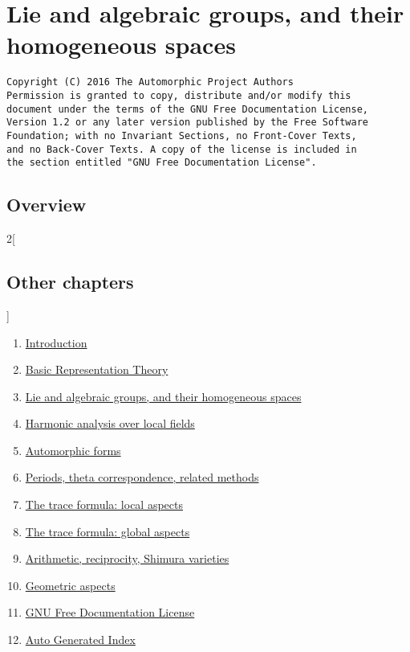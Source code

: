 \documentclass{stacks-project-book}
\theoremstyle{plain}
\theoremstyle{definition}
\theoremstyle{remark}
\numberwithin{equation}{subsection}
\begin{document}
%

\chapter{Lie and algebraic groups, and their homogeneous spaces}



\label{algebraicgroups-section-phantom}

\begin{verbatim}
Copyright (C) 2016 The Automorphic Project Authors
Permission is granted to copy, distribute and/or modify this
document under the terms of the GNU Free Documentation License,
Version 1.2 or any later version published by the Free Software
Foundation; with no Invariant Sections, no Front-Cover Texts,
and no Back-Cover Texts. A copy of the license is included in
the section entitled "GNU Free Documentation License".
\end{verbatim}



\section{Overview}
\label{algebraicgroups-section-overview}

\noindent





\begin{multicols}{2}[\section{Other chapters}]
\noindent
\begin{enumerate}
\item \hyperref[introduction-section-phantom]{Introduction}
\item \hyperref[representationtheory-section-phantom]{Basic Representation Theory}
\item \hyperref[algebraicgroups-section-phantom]{Lie and algebraic groups, and their homogeneous spaces}
\item \hyperref[harmonicanalysis-section-phantom]{Harmonic analysis over local fields}
\item \hyperref[automorphicforms-section-phantom]{Automorphic forms}
\item \hyperref[periods-section-phantom]{Periods, theta correspondence, related methods}
\item \hyperref[traceformulalocal-section-phantom]{The trace formula: local aspects}
\item \hyperref[traceformulaglobal-section-phantom]{The trace formula: global aspects}
\item \hyperref[arithmetic-section-phantom]{Arithmetic, reciprocity, Shimura varieties}
\item \hyperref[geometric-section-phantom]{Geometric aspects}
\item \hyperref[fdl-section-phantom]{GNU Free Documentation License}
\item \hyperref[index-section-phantom]{Auto Generated Index}
\end{enumerate}
\end{multicols}
\end{document}
